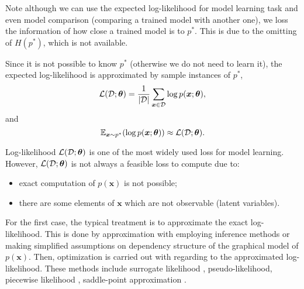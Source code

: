 Note although we can use the expected log-likelihood for model learning task and even model comparison (comparing a trained model with another one), we loss the information of how close a trained model is to $p^{\ast}$. This is due to the omitting of $H(p^{\ast})$, which is not available.

Since it is not possible to know $p^{\ast}$ (otherwise we do not need to learn it), the expected log-likelihood is approximated by sample instances of $p^{\ast}$,
\begin{equation}
  \mathcal{L}(\mathcal{D}; \bm{\theta}) = \frac{1}{| \mathcal{D} |}\sum_{\bm{x}\in \mathcal{D}}\log{p(\bm{x};\bm{\theta})},
\end{equation}
and
\begin{equation}
  \mathbb{E}_{\bm{x}\sim p^{\ast}}(\log{{p(\bm{x}; \bm{\theta})}}) \approx \mathcal{L}(\mathcal{D}; \bm{\theta}).
\end{equation}

Log-likelihood $\mathcal{L}(\mathcal{D}; \bm{\theta})$ is one of the most widely used loss for model learning. However, $\mathcal{L}(\mathcal{D}; \bm{\theta})$ is not always a feasible loss to compute due to:
\begin{itemize}
\item exact computation of $p(\bm{x})$ is not possible;
\item there are some elements of $\bm{x}$ which are not observable (latent variables).
\end{itemize}
For the first case, the typical treatment is to approximate the exact log-likelihood. This is done by approximation with employing inference methods or   making simplified assumptions on dependency structure of the graphical model of $p(\bm{x})$. Then, optimization is carried out with regarding to the approximated log-likelihood. These methods include surrogate likelihood \cite{wainwright06estimating, lu2019blockBP}, pseudo-likelihood\cite{qu2019gmnn, lazarogredilla2019learning}, piecewise likelihood \cite{sutton2012piecewise, lin_2016_CVPR}, saddle-point approximation \cite{srikumar-etal-2012-amortizing, NIPS2019_9687}.

